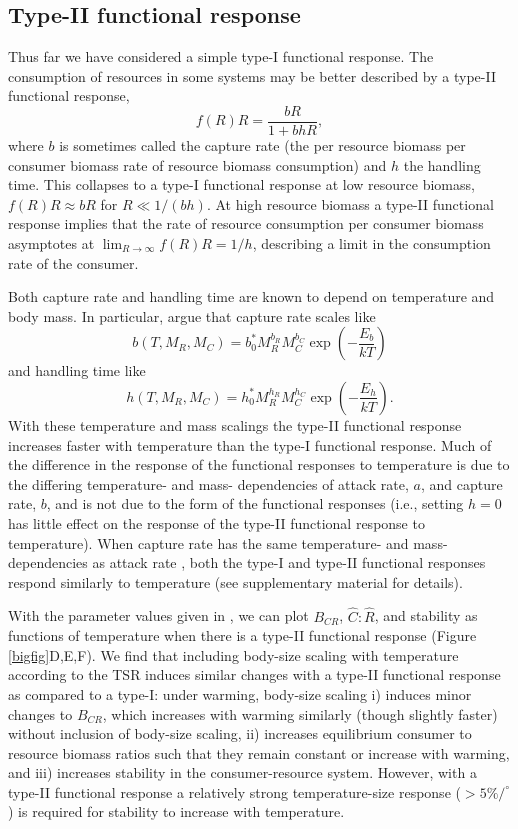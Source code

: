 \documentclass[11pt]{article}
\begin{document}
\subsection*{Type-II functional response}

Thus far we have considered a simple type-I functional response.
The consumption of resources in some systems may be better described by a type-II functional response, 
\[f(R)R = \frac{bR}{1 + b h R},\] 
where $b$ is sometimes called the capture rate (the per resource biomass per consumer biomass rate of resource biomass consumption) and $h$ the handling time.
This collapses to a type-I functional response at low resource biomass, $f(R)R \approx bR$ for $R \ll 1/(b h)$.
At high resource biomass a type-II functional response implies that the rate of resource consumption per consumer biomass asymptotes at $\lim_{R\rightarrow\infty}f(R) R = 1/h$, describing a limit in the consumption rate of the consumer. 

Both capture rate and handling time are known to depend on temperature and body mass.
In particular, \cite{Rall2012} argue that capture rate scales like 
\[b(T, M_R, M_C) = b_0^* M_R^{b_R} M_C^{b_C} \exp \left(- \frac{E_b}{k T} \right)\]
and handling time like 
\[h(T, M_R, M_C) = h_0^* M_R^{h_R} M_C^{h_C} \exp \left(-\frac{E_h}{k T} \right).\]
With these temperature and mass scalings the type-II functional response increases faster with temperature than the type-I functional response. 
Much of the difference in the response of the functional responses to temperature is due to the differing temperature- and mass- dependencies of attack rate, $a$, and capture rate, $b$, and is not due to the form of the functional responses (i.e., setting $h=0$ has little effect on the response of the type-II functional response to temperature).
When capture rate has the same temperature- and mass- dependencies as attack rate \citep[as given in][]{Gilbert2014}, both the type-I and type-II functional responses respond similarly to temperature (see supplementary material for details).

With the parameter values given in \cite{Rall2012}, we can plot $B_{CR}$, $\hat{C}:\hat{R}$, and stability as functions of temperature when there is a type-II functional response (Figure \ref{bigfig}D,E,F).
We find that including body-size scaling with temperature according to the TSR induces similar changes with a type-II functional response as compared to a type-I: under warming, body-size scaling i) induces minor changes to $B_{CR}$, which increases with warming similarly (though slightly faster) without inclusion of body-size scaling, ii) increases equilibrium consumer to resource biomass ratios such that they remain constant or increase with warming, and iii) increases stability in the consumer-resource system.
However, with a type-II functional response a relatively strong temperature-size response ($>5\%/^\circ$) is required for stability to increase with temperature.
\end{document}
